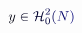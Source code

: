 \documentclass[12pt]{article}
\begin{document}
\makeatletter
\renewcommand*{\@textcolor}[3]{%
  \protect\leavevmode
  \begingroup
    \color#1{#2}#3%
  \endgroup
}
\makeatother
\begin{displaymath}
\mathcolor[RGB]{0,0,15}{y} \mathcolor[RGB]{0,0,30}{\in} \mathcal { \mathcolor[RGB]{0,0,45}{H} } _ { \mathcolor[RGB]{0,0,60}{0} } ^ { \mathcolor[RGB]{0,0,75}{2} } \mathcolor[RGB]{0,0,90}{(} \mathcolor[RGB]{0,0,105}{N} \mathcolor[RGB]{0,0,120}{)}
\end{displaymath}
\end{document}
